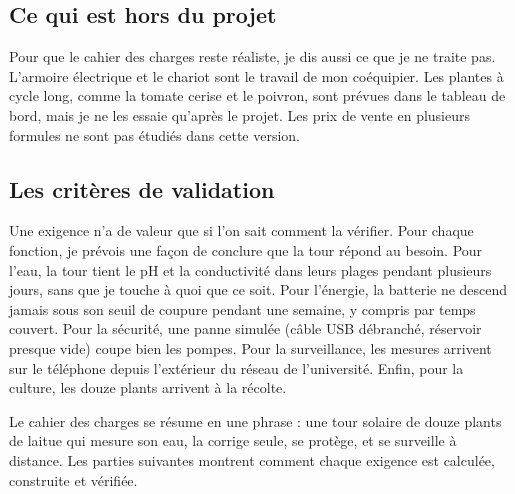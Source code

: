 \subsection{Ce qui est hors du projet}

Pour que le cahier des charges reste réaliste, je dis aussi ce que je ne traite pas. L'armoire électrique et le chariot sont le travail de mon coéquipier. Les plantes à cycle long, comme la tomate cerise et le poivron, sont prévues dans le tableau de bord, mais je ne les essaie qu'après le projet. Les prix de vente en plusieurs formules ne sont pas étudiés dans cette version.

\subsection{Les critères de validation}

Une exigence n'a de valeur que si l'on sait comment la vérifier. Pour chaque fonction, je prévois une façon de conclure que la tour répond au besoin. Pour l'eau, la tour tient le pH et la conductivité dans leurs plages pendant plusieurs jours, sans que je touche à quoi que ce soit. Pour l'énergie, la batterie ne descend jamais sous son seuil de coupure pendant une semaine, y compris par temps couvert. Pour la sécurité, une panne simulée (câble USB débranché, réservoir presque vide) coupe bien les pompes. Pour la surveillance, les mesures arrivent sur le téléphone depuis l'extérieur du réseau de l'université. Enfin, pour la culture, les douze plants arrivent à la récolte.

\begin{aretenir}
Le cahier des charges se résume en une phrase : une tour solaire de douze plants de laitue qui mesure son eau, la corrige seule, se protège, et se surveille à distance. Les parties suivantes montrent comment chaque exigence est calculée, construite et vérifiée.
\end{aretenir}
